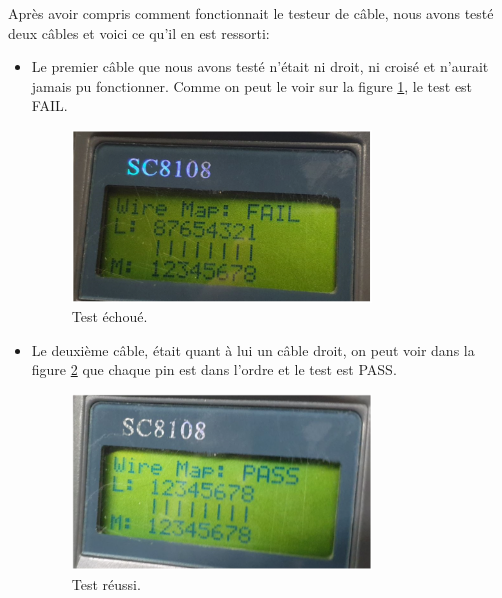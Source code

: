 \documentclass[a4paper]{article}
\begin{document}
Après avoir compris comment fonctionnait le testeur de câble, nous avons testé deux câbles et voici ce qu’il en est ressorti:
\begin{itemize}
  \item Le premier câble que nous avons testé n’était ni droit, ni croisé et n’aurait jamais pu fonctionner. Comme on peut le voir sur la figure \ref{fig:failTestCable}, le test est FAIL.
  \begin{figure}[H]
    \centering
    \includegraphics[width=0.75\textwidth]{fail-test-cable1.PNG}
    \caption{Test échoué.}
    \label{fig:failTestCable}
  \end{figure}
  \item Le deuxième câble, était quant à lui un câble droit, on peut voir dans la figure \ref{fig:passTestCable} que chaque pin est dans l'ordre et le test est PASS.
  \begin{figure}[H]
    \centering
    \includegraphics[width=0.75\textwidth]{pass-test-cable1.PNG}
    \caption{Test réussi.}
    \label{fig:passTestCable}
  \end{figure}
\end{itemize}
\end{document}
